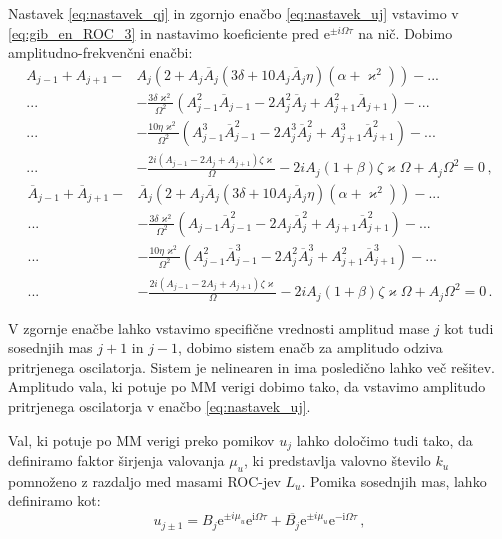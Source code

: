         Nastavek \eqref{eq:nastavek_qj} in zgornjo enačbo \eqref{eq:nastavek_uj} vstavimo v \eqref{eq:gib_en_ROC_3} in nastavimo koeficiente pred $\mathrm{e}^{	\pm i \Omega \tau}$ na nič. Dobimo amplitudno-frekvenčni enačbi:
        \begin{align}
            A_{j-1}+A_{j+1}-&A_{j}\left(2+ A_{j} \overline{A}_{j}(3 \delta+10 A_{j} \overline{A}_{j} \eta)\left(\alpha+\varkappa ^2\right)\right) - ...\nonumber \\
            ... &-\frac{3\delta\varkappa^2}{\Omega^2}\left(A_{j-1}^2 \overline{A}_{j-1}-2 A_{j}^2 \overline{A}_{j}+A_{j+1}^2 \overline{A}_{j+1}\right) - ... \nonumber \\
            ... & - \frac{10\eta\varkappa^2}{\Omega^2}\left(A_{j-1}^3 \overline{A}_{j-1}^2-2 A_{j}^3 \overline{A}_{j}^2+A_{j+1}^3 \overline{A}_{j+1}^2\right) -     ... \nonumber\\
            ... &- \frac{2 i(A_{j-1}-2 A_{j}+A_{j+1}) \zeta \varkappa }{\Omega} -2 i A_{j}  (1+\beta) \zeta \varkappa  \Omega+A_{j} \Omega^2 = 0 \,,
        \end{align}
        \begin{align}
            \overline{A}_{j-1}+\overline{A}_{j+1}-&\overline{A}_{j}\left(2+A_{j} \overline{A}_{j}(3 \delta+10 A_{j} \overline{A}_{j} \eta)\left(\alpha+\varkappa ^2\right)\right) - ...\nonumber \\
            ... &-\frac{3\delta\varkappa^2}{\Omega^2}\left(A_{j-1} \overline{A}_{j-1}^2-2 A_{j} \overline{A}_{j}^2+A_{j+1} \overline{A}_{j+1}^2\right) - ... \nonumber \\
            ... & - \frac{10\eta\varkappa^2}{\Omega^2}\left(A_{j-1}^2 \overline{A}_{j-1}^3-2 A_{j}^2 \overline{A}_{j}^3+A_{j+1}^2 \overline{A}_{j+1}^3\right) -     ... \nonumber\\
            ... &- \frac{2 i(A_{j-1}-2 A_{j}+A_{j+1}) \zeta \varkappa }{\Omega} -2 i A_{j} (1+\beta) \zeta \varkappa  \Omega+A_{j} \Omega^2 = 0 \,.
        \end{align}
        
        V zgornje enačbe lahko vstavimo specifične vrednosti amplitud mase $j$ kot tudi sosednjih mas $j+1$ in $j-1$, dobimo sistem enačb za amplitudo odziva pritrjenega oscilatorja. Sistem je nelinearen in ima posledično lahko več rešitev. Amplitudo vala, ki potuje po MM verigi dobimo tako, da vstavimo amplitudo pritrjenega oscilatorja v enačbo \eqref{eq:nastavek_uj}.
        
        \newpage
        Val, ki potuje po MM verigi preko pomikov $u_j$ lahko določimo tudi tako, da definiramo faktor širjenja valovanja $\mu_u$, ki predstavlja valovno število $k_u$ pomnoženo z razdaljo med masami ROC-jev $L_u$. Pomika sosednjih mas, lahko definiramo kot:
        \begin{equation}
            u_{j \pm 1}= B_j \mathrm{e}^{\pm i \mu_u} \mathrm{e}^{\mathrm{i} \Omega \tau} + 
            \overline{B_j} \mathrm{e}^{\pm i \mu_u} \mathrm{e}^{-\mathrm{i} \Omega \tau}\,,
        \end{equation}
        
